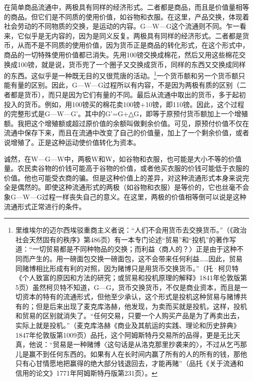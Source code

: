\documentclass{ctexbook}
\begin{document}
    在简单商品流通中，两极具有同样的经济形式。二者都是商品，而且是价值量相等的商品。但它们是不同质的使用价值，如谷物和衣服。在这里，产品交换，体现着社会劳动的不同物质的交换，是运动的内容。G—W—G这个流通则不同。乍一看来，它似乎是无内容的，因为是同义反复。两极具有同样的经济形式。二者都是货币，从而不是不同质的使用价值，因为货币正是商品的转化形式，在这个形式中，商品的一切特殊使用价值都已消失。先用100镑交换成棉花，然后又用这些棉花交换成100镑，就是说，货币兜了一个圈子又交换成货币，同样的东西又交换成同样的东西。这似乎是一种既无目的又很荒唐的活动。\footnote{里维埃尔的迈尔西埃驳重商主义者说：“人们不会用货币去交换货币。”（《政治社会天然固有的秩序》第486页）有一本专门论述“贸易”和“投机”的著作写道：“一切贸易都是不同种物品的交换；而利益〈商人的？〉正是由于这种不同而产生的。用一磅面包交换一磅面包，这不会带来任何利益……因此，贸易同赌博相比形成有利的对照，因为赌博只是用货币交换货币。”（托·柯贝特《个人致富的原因和方法的研究；或贸易和投机原理的解释》1841年伦敦版第5页）虽然柯贝特不知道，G—G，货币交换货币，不仅是商业资本，而且是一切资本的特有的流通形式，但他至少承认，这个形式是投机这种贸易与赌博共有的；但是后来出现了麦克库洛赫，他发现，为卖而买就是投机，这样，投机和贸易的区别就消失了。“任何交易，只要一个人购买产品是为了再卖出去，实际上就是投机。”（麦克库洛赫《商业及其航运的实践、理论和历史辞典》1847年伦敦版第1009页）品托，这个阿姆斯特丹交易所的品得，更是无比天真，他说：“贸易是一种赌博〈这句话是从洛克那里抄袭来的〉，不过从乞丐那儿是赢不到任何东西的。如果有人在长时间内赢了所有的人的所有的钱，那他只有心甘情愿地把赢得的绝大部分钱退回去，才能再赌”（品托《关于流通和信用的论文》1771年阿姆斯特丹版第231页）。}一个货币额和另一个货币额只能有量的区别。因此，G—W—G过程所以有内容，不是因为两极有质的区别（二者都是货币），而只是因为它们有量的不同。最后从流通中取出的货币，多于起初投入的货币。例如，用100镑买的棉花卖100镑+10镑，即110镑。因此，这个过程的完整形式是G—W—G'。其中的G'=G+△G，即等于原预付货币额加上一个增殖额。我把这个增殖额或超过原价值的余额叫做剩余价值。可见，原预付价值不仅在流通中保存下来，而且在流通中改变了自己的价值量，加上了一个剩余价值，或者说增殖了。正是这种运动使价值转化为资本。

    诚然，在W—G—W中，两极W和W，如谷物和衣服，也可能是大小不等的价值量。农民卖谷物的价钱可能高于谷物的价值，或者他买衣服的价钱可能低于衣服的价值。他也可能受衣商的骗。但是这种价值上的差异，对这种流通形式本身来说完全是偶然的。即使这种流通形式的两极（如谷物和衣服）是等价的，它也丝毫不会象G—W—G过程一样丧失自己的意义。在这里，两极的价值相等倒可以说是这种流通形式正常进行的条件。
\end{document}
